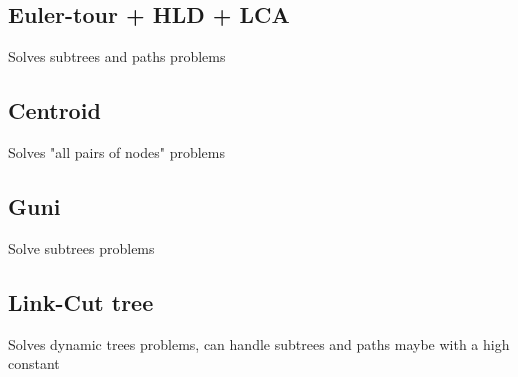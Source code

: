 
\subsection{Euler-tour + HLD + LCA }

Solves subtrees and paths problems \\


\subsection{Centroid }

Solves "all pairs of nodes" problems \\


\subsection{Guni }

Solve subtrees problems\\


\subsection{Link-Cut tree }

Solves dynamic trees problems, can handle subtrees and paths maybe with a high constant\\
